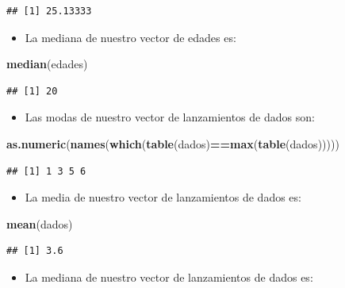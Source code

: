\documentclass[]{book}
\newenvironment{Shaded}{\begin{snugshade}}{\end{snugshade}}
\newcommand{\KeywordTok}[1]{\textcolor[rgb]{0.13,0.29,0.53}{\textbf{#1}}}
\newcommand{\NormalTok}[1]{#1}
\newcommand{\OperatorTok}[1]{\textcolor[rgb]{0.81,0.36,0.00}{\textbf{#1}}}
\providecommand{\tightlist}{%
  \setlength{\itemsep}{0pt}\setlength{\parskip}{0pt}}
\theoremstyle{definition}
\theoremstyle{definition}
\theoremstyle{definition}
\theoremstyle{remark}
\begin{document}
\begin{verbatim}
## [1] 25.13333
\end{verbatim}

\begin{itemize}
\tightlist
\item
  La mediana de nuestro vector de edades es:
\end{itemize}

\begin{Shaded}
\begin{Highlighting}[]
\KeywordTok{median}\NormalTok{(edades)}
\end{Highlighting}
\end{Shaded}

\begin{verbatim}
## [1] 20
\end{verbatim}

\begin{itemize}
\tightlist
\item
  Las modas de nuestro vector de lanzamientos de dados son:
\end{itemize}

\begin{Shaded}
\begin{Highlighting}[]
\KeywordTok{as.numeric}\NormalTok{(}\KeywordTok{names}\NormalTok{(}\KeywordTok{which}\NormalTok{(}\KeywordTok{table}\NormalTok{(dados)}\OperatorTok{==}\KeywordTok{max}\NormalTok{(}\KeywordTok{table}\NormalTok{(dados))))) }
\end{Highlighting}
\end{Shaded}

\begin{verbatim}
## [1] 1 3 5 6
\end{verbatim}

\begin{itemize}
\tightlist
\item
  La media de nuestro vector de lanzamientos de dados es:
\end{itemize}

\begin{Shaded}
\begin{Highlighting}[]
\KeywordTok{mean}\NormalTok{(dados)}
\end{Highlighting}
\end{Shaded}

\begin{verbatim}
## [1] 3.6
\end{verbatim}

\begin{itemize}
\tightlist
\item
  La mediana de nuestro vector de lanzamientos de dados es:
\end{itemize}
\end{document}
